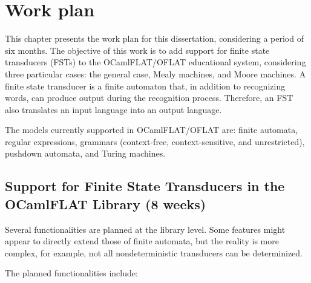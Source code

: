 
%

\chapter{Work plan}
\label{cha:work_plan}

This chapter presents the work plan for this dissertation, considering a period of six months.
The objective of this work is to add support for finite state transducers (FSTs) to the OCamlFLAT/OFLAT educational system, 
considering three particular cases: the general case, Mealy machines, and Moore machines. A finite state transducer is a finite automaton that, 
in addition to recognizing words, can produce output during the recognition process. Therefore, an FST also translates an input language into an output language.

The models currently supported in OCamlFLAT/OFLAT are: finite automata, regular expressions, grammars 
(context-free, context-sensitive, and unrestricted), pushdown automata, and Turing machines.

\section{Support for Finite State Transducers in the OCamlFLAT Library (8 weeks)}

Several functionalities are planned at the library level. Some features might appear to directly extend those of finite automata, 
but the reality is more complex, for example, not all nondeterministic transducers can be determinized.

The planned functionalities include:

